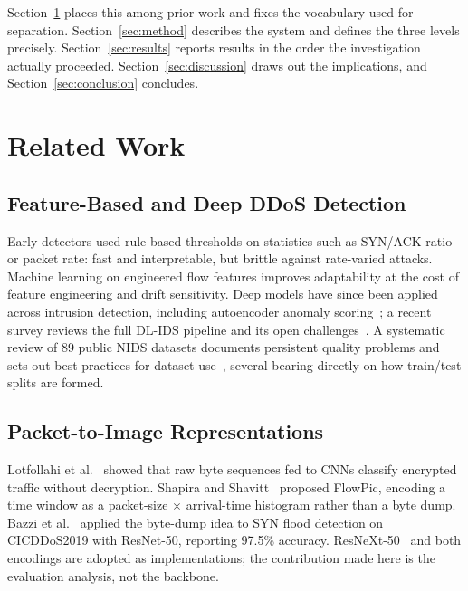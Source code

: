 \documentclass[conference]{IEEEtran} \IEEEoverridecommandlockouts
\begin{document}
Section~\ref{sec:related} places this among prior work and fixes the vocabulary
used for separation. Section~\ref{sec:method} describes the system and defines
the three levels precisely. Section~\ref{sec:results} reports results in the
order the investigation actually proceeded. Section~\ref{sec:discussion} draws
out the implications, and Section~\ref{sec:conclusion} concludes.

\section{Related Work}
\label{sec:related}

\subsection{Feature-Based and Deep DDoS Detection} Early detectors used rule-based thresholds on statistics such as SYN/ACK ratio
or packet rate: fast and interpretable, but brittle against rate-varied
attacks. Machine learning on engineered flow features improves adaptability at
the cost of feature engineering and drift sensitivity. Deep models have since
been applied across intrusion detection, including autoencoder anomaly
scoring~\cite{mirsky2018kitsune}; a recent survey reviews the full DL-IDS
pipeline and its open challenges~\cite{xu2025dlids}. A systematic review of 89
public NIDS datasets documents persistent quality problems and sets out best
practices for dataset use~\cite{goldschmidt2025datasets}, several bearing
directly on how train/test splits are formed.

\subsection{Packet-to-Image Representations} Lotfollahi et
al.~\cite{lotfollahi2020deep} showed that raw byte sequences fed to CNNs
classify encrypted traffic without decryption. Shapira and
Shavitt~\cite{shapira2019flowpic} proposed FlowPic, encoding a time window as a
packet-size $\times$ arrival-time histogram rather than a byte dump. Bazzi et
al.~\cite{bazzi2024resnet} applied the byte-dump idea to SYN flood detection on
CICDDoS2019 with ResNet-50, reporting 97.5\% accuracy.
ResNeXt-50~\cite{xie2017aggregated} and both encodings are adopted as
implementations; the contribution made here is the evaluation analysis, not the
backbone.
\end{document}
